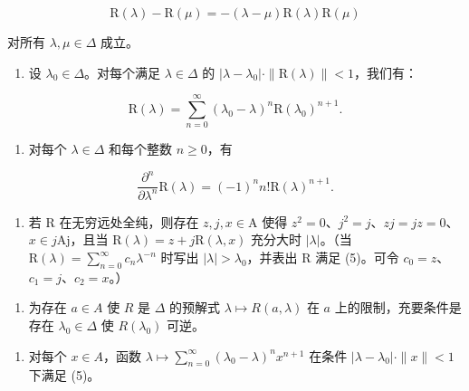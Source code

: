 \[
\mathrm{R} (\lambda) - \mathrm{R} (\mu) = - (\lambda - \mu) \mathrm{R} (\lambda) \mathrm{R} (\mu)\tag{5}
\]

对所有 \(\lambda,\mu\in\Delta\) 成立。

\begin{enumerate}
\def\labelenumi{\alph{enumi})}
\tightlist
\item
  设 \(\lambda_0\in \Delta\)。对每个满足 \(\lambda \in \Delta\) 的 \(|\lambda -\lambda_0|\cdot \| \mathrm{R}(\lambda)\| <  1\)，我们有：
\end{enumerate}

\[
\mathrm{R} (\lambda) = \sum_ {n = 0} ^ {\infty} (\lambda_ {0} - \lambda) ^ {n} \mathrm{R} (\lambda_ {0}) ^ {n + 1}.
\]

\begin{enumerate}
\def\labelenumi{\alph{enumi})}
\setcounter{enumi}{1}
\tightlist
\item
  对每个 \(\lambda \in \Delta\) 和每个整数 \(n\geqslant 0\)，有
\end{enumerate}

\[
\frac {\partial^ {n}}{\partial \lambda^ {n}} \mathrm{R} (\lambda) = (- 1) ^ {n} n! \mathrm{R} (\lambda) ^ {n + 1}.
\]

\begin{enumerate}
\def\labelenumi{\alph{enumi})}
\setcounter{enumi}{2}
\tightlist
\item
  若 R 在无穷远处全纯，则存在 \(z, j, x \in \mathrm{A}\) 使得 \(z^2 = 0\)、\(j^2 = j\)、\(zj = jz = 0\)、\(x \in j\mathrm{Aj}\)，且当 \(\mathrm{R}(\lambda) = z + j\mathrm{R}(\lambda, x)\) 充分大时 \(|\lambda|\)。（当 \(\mathrm{R}(\lambda) = \sum_{n=0}^{\infty} c_n \lambda^{-n}\) 时写出 \(|\lambda| > \lambda_0\)，并表出 R 满足 (5)。可令 \(c_0 = z\)、\(c_1 = j\)、\(c_2 = x\)。）
\end{enumerate}

\begin{enumerate}
\def\labelenumi{\alph{enumi})}
\setcounter{enumi}{3}
\tightlist
\item
  为存在 \(a \in A\) 使 \(R\) 是 \(\Delta\) 的预解式 \(\lambda \mapsto R(a, \lambda)\) 在 \(a\) 上的限制，充要条件是存在 \(\lambda_0 \in \Delta\) 使 \(R(\lambda_0)\) 可逆。
\end{enumerate}

\begin{enumerate}
\def\labelenumi{\alph{enumi})}
\setcounter{enumi}{4}
\tightlist
\item
  对每个 \(x \in A\)，函数 \(\lambda \mapsto \sum_{n=0}^{\infty} (\lambda_0 - \lambda)^n x^{n+1}\) 在条件 \(|\lambda - \lambda_0| \cdot \|x\| < 1\) 下满足 (5)。
\end{enumerate}

